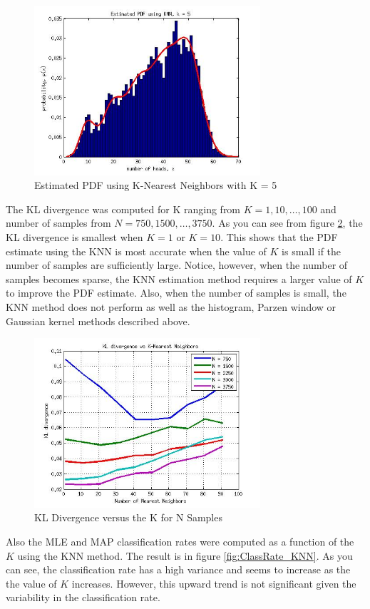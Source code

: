 \documentclass[journal]{IEEEtran}
\begin{document}
\begin{figure}
\centering
\includegraphics[width=3.3in]{../images/PDF_KNN.jpg}
\caption{Estimated PDF using K-Nearest Neighbors with K = 5}
\label{fig:PDF_KNN}
\end{figure}

\par The KL divergence was computed for K ranging from \(K = 1, 10, \ldots, 100\) and number of samples from \(N = 750, 1500,\ldots, 3750\). As you can see from figure \ref{fig:KL_KNN}, the KL divergence is smallest when \(K = 1\) or \(K = 10\). This shows that the PDF estimate using the KNN is most accurate when the value of \(K\) is small if the number of samples are sufficiently large. Notice, however, when the number of samples becomes sparse, the KNN estimation method requires a larger value of \(K\) to improve the PDF estimate. Also, when the number of samples is small, the KNN method does not perform as well as the histogram, Parzen window or Gaussian kernel methods described above.

\begin{figure}
\centering
\includegraphics[width=3.3in]{../images/KL_KNN.jpg}
\caption{KL Divergence versus the K for N Samples}
\label{fig:KL_KNN}
\end{figure}

\par Also the MLE and MAP classification rates were computed as a function of the \(K\) using the KNN method. The result is in figure \ref{fig:ClassRate_KNN}. As you can see, the classification rate has a high variance and seems to increase as the the value of \(K\) increases. However, this upward trend is not significant given the variability in the classification rate.
\end{document}
